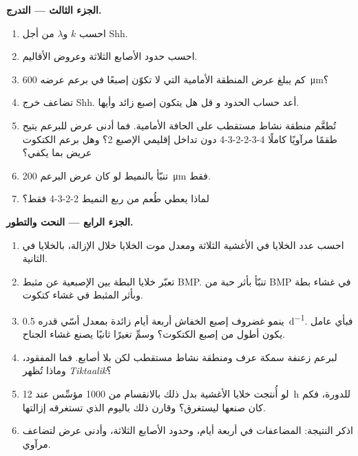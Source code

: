 \begin{problem}
\medskip
\noindent\textbf{الجزء الثالث --- التدرج.}
\begin{enumerate}[resume]
  \item احسب $k$ و$\lambda$ من أجل Shh.
  \item احسب حدود الأصابع الثلاثة وعروض الأقاليم.
  \item كم يبلغ عرض المنطقة الأمامية التي لا تكوّن إصبعًا في
        برعم عرضه \qty{600}{\micro m}؟
  \item {} تضاعف خرج Shh. أعد حساب الحدود و
        قل هل يتكون إصبع زائد وأيها.
  \item تُطعَّم منطقة نشاط مستقطب على الحافة الأمامية. فما أدنى عرض
        للبرعم يتيح طقمًا مرآويًا كاملًا 4-3-2-2-3-4 دون
        تداخل إقليمي الإصبع 2؟ وهل برعم الكتكوت عريض
        بما يكفي؟
  \item تنبّأ بالنميط لو كان عرض البرعم \qty{200}{\micro m}
        فقط.
  \item لماذا يعطي طُعم من ربع  النميط 2-2-3-4 فقط؟
\end{enumerate}

\medskip
\noindent\textbf{الجزء الرابع --- النحت والتطور.}
\begin{enumerate}[resume]
  \item احسب عدد الخلايا في الأغشية الثلاثة ومعدل
        موت الخلايا خلال الإزالة، بالخلايا في الثانية.
  \item تعبّر خلايا البطة بين الإصبعية عن مثبط BMP. تنبّأ
        بأثر حبة من BMP في غشاء بطة وبأثر
        المثبط في غشاء كتكوت.
  \item ينمو غضروف إصبع الخفاش أربعة أيام زائدة بمعدل
        أسّي قدره \qty{0.5}{d^{-1}}. فبأي عامل يكون
        أطول من إصبع الكتكوت؟ وسمِّ تغيرًا ثانيًا يصنع
        غشاء الجناح.
  \item لبرعم زعنفة سمكة عرف ومنطقة نشاط مستقطب لكن بلا أصابع. فما
        المفقود، وماذا تُظهر \emph{Tiktaalik}؟
  \item لو أُنتجت خلايا الأغشية بدل ذلك بالانقسام من
        \num{1000} مؤسِّس عند \qty{12}{h} للدورة، فكم كان
        صنعها ليستغرق؟ وقارن ذلك باليوم الذي تستغرقه
        إزالتها.
  \item اذكر النتيجة: المضاعفات في أربعة أيام، وحدود الأصابع
        الثلاثة، وأدنى عرض لتضاعف مرآوي.
\end{enumerate}
\end{problem}
